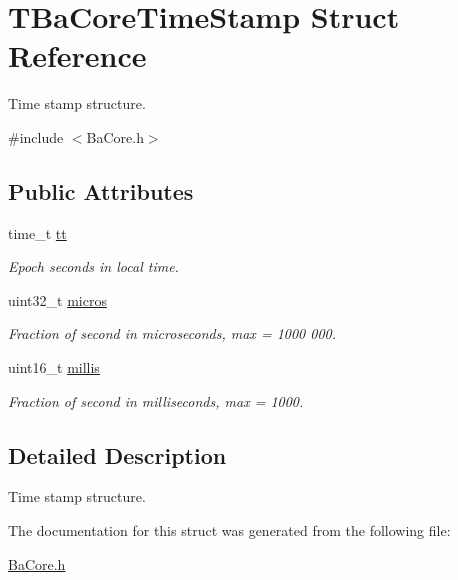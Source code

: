 \hypertarget{structTBaCoreTimeStamp}{}\section{T\+Ba\+Core\+Time\+Stamp Struct Reference}
\label{structTBaCoreTimeStamp}


Time stamp structure.  




{\ttfamily \#include $<$Ba\+Core.\+h$>$}

\subsection*{Public Attributes}
\begin{DoxyCompactItemize}
\item 
\mbox{\label{structTBaCoreTimeStamp_abcb409eaa16b055c47149b1f026cb8a7}} 
time\+\_\+t \hyperlink{structTBaCoreTimeStamp_abcb409eaa16b055c47149b1f026cb8a7}{tt}
\begin{DoxyCompactList}\small\item\em Epoch seconds in local time. \end{DoxyCompactList}\item 
\mbox{\label{structTBaCoreTimeStamp_ae2b1c1ce27cdd45036d1b1f4fd399ef5}} 
uint32\+\_\+t \hyperlink{structTBaCoreTimeStamp_ae2b1c1ce27cdd45036d1b1f4fd399ef5}{micros}
\begin{DoxyCompactList}\small\item\em Fraction of second in microseconds, max = 1000 000. \end{DoxyCompactList}\item 
\mbox{\label{structTBaCoreTimeStamp_ade3fff632e69aeabddc36cbafdb271f3}} 
uint16\+\_\+t \hyperlink{structTBaCoreTimeStamp_ade3fff632e69aeabddc36cbafdb271f3}{millis}
\begin{DoxyCompactList}\small\item\em Fraction of second in milliseconds, max = 1000. \end{DoxyCompactList}\end{DoxyCompactItemize}


\subsection{Detailed Description}
Time stamp structure. 

The documentation for this struct was generated from the following file\+:\begin{DoxyCompactItemize}
\item 
\hyperlink{BaCore_8h}{Ba\+Core.\+h}\end{DoxyCompactItemize}
